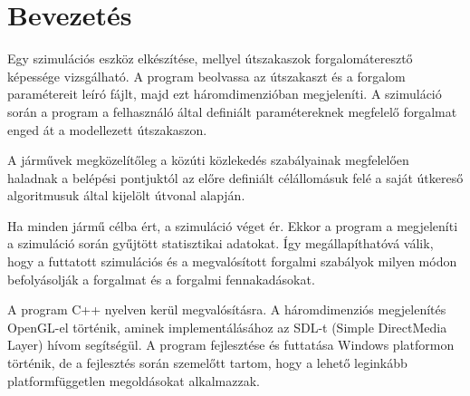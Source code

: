 \chapter{Bevezetés}
\label{ch:Introduction}

Egy szimulációs eszköz elkészítése, mellyel útszakaszok forgalomáteresztő képessége vizsgálható.
A program beolvassa az útszakaszt és a forgalom paramétereit leíró fájlt, majd ezt háromdimenzióban megjeleníti.
A szimuláció során a program a felhasználó által definiált paramétereknek megfelelő forgalmat enged át a modellezett útszakaszon.

A járművek megközelítőleg a közúti közlekedés szabályainak megfelelően haladnak a belépési pontjuktól az előre definiált célállomásuk felé a saját útkereső algoritmusuk által kijelölt útvonal alapján.

Ha minden jármű célba ért, a szimuláció véget ér. Ekkor a program a megjeleníti a szimuláció során gyűjtött statisztikai adatokat. Így megállapíthatóvá válik, hogy a futtatott szimulációs és a megvalósított forgalmi szabályok milyen módon befolyásolják a forgalmat és a forgalmi fennakadásokat.

A program C++ nyelven kerül megvalósításra. A háromdimenziós megjelenítés OpenGL-el történik, aminek implementálásához az  SDL-t (Simple DirectMedia Layer) hívom segítségül.
A program fejlesztése és futtatása Windows platformon történik, de a fejlesztés során szemelőtt tartom, hogy a lehető leginkább platformfüggetlen megoldásokat alkalmazzak.
